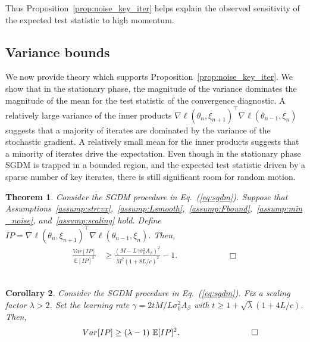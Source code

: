 \documentclass[conference]{IEEEtran}
\newcommand{\Ex}[1]{\mathbb{E}[ #1 ]}
\newtheorem{theorem}{Theorem}
\newtheorem{corollary}[theorem]{Corollary}
\begin{document}
Thus Proposition~\ref{prop:noise_key_iter} helps explain the observed sensitivity of the expected test statistic to high momentum.


\subsection{Variance bounds}
We now provide theory which supports Proposition~\ref{prop:noise_key_iter}. We show that in the stationary phase, the magnitude of the variance dominates the magnitude of the mean 
for the test statistic of the convergence diagnostic.  A relatively large variance of the inner products $\nabla \ell (\theta_n, \xi_{n+1})^\top \nabla \ell (\theta_{n-1}, \xi_n)$ suggests that a majority of iterates are dominated by the variance of the stochastic gradient.
A relatively small mean for the inner products suggests that a minority of iterates drive the expectation. Even though in the stationary phase SGDM is trapped in a bounded region, and the expected test statistic driven by a sparse number of key iterates, there is still significant room for random motion.

\begin{theorem} 
\label{thm:ip_var_bound}
Consider the SGDM procedure in Eq.~(\ref{eq:sgdm}).
Suppose that Assumptions~\ref{assump:strcvx},~\ref{assump:Lsmooth},~\ref{assump:Fbound},~\ref{assump:min_noise}, and~\ref{assump:scaling} hold. Define\\ $IP = \nabla \ell(\theta_n, \xi_{n+1})^\top \nabla \ell(\theta_{n-1}, \xi_n)$. 
Then,
\begin{align*}
\frac{Var [ IP ]}{\mathbb{E} [ IP ]^2} 
&\geq \frac{ ( M - L \gamma \sigma_0^2 A_\beta )^2 }{M^2 ( 1 + 8 L / c )^2 } 
- 1.\hspace{1in}\Box
\end{align*}\\
\end{theorem}

\begin{corollary}
\label{cor:set_gamma_threshold}
Consider the SGDM procedure in Eq.~(\ref{eq:sgdm}).
Fix a scaling factor $\lambda > 2$.
Set the learning rate $\gamma = 2 t M / L \sigma_0^2 A_\beta$ with $t  \geq 1 + \sqrt{ \lambda } ( 1 + 4 L / c )$. 
Then, 
\begin{equation*}
\hspace{0.5in}Var [IP] \geq (\lambda - 1) \ \Ex{IP}^2.\hspace{1.2in}\Box
\end{equation*}
\end{corollary}
\end{document}
